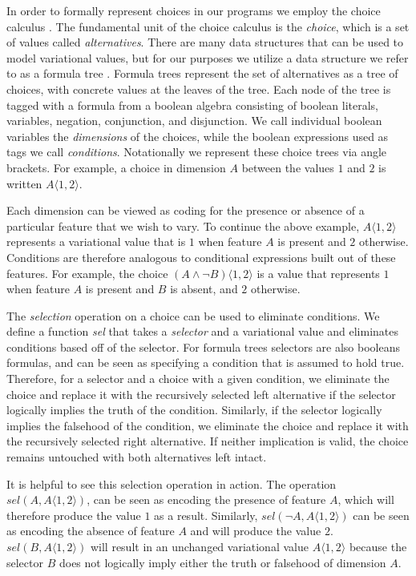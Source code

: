 \documentclass[12pt,oneside]{book}
\newcommand{\tagtree}[3]{#1 \langle #2, #3 \rangle}
\begin{document}
In order to formally represent choices in our programs we employ the choice
calculus \cite{Walk13thesis,EW11tosem}. The fundamental unit of the choice calculus is
the \emph{choice}, which is a set of values called \emph{alternatives}.
There are many data structures that can be used to model
variational values, but for our purposes we utilize a data structure we refer
to as a formula tree \cite{Walk14onward,WO14gpce}.
Formula trees represent the set of alternatives as a tree of choices, with concrete
values at the leaves of the tree. Each node of the tree is tagged with a formula from a boolean
algebra consisting of boolean literals, variables, negation, conjunction, and disjunction. We call individual
boolean variables the \emph{dimensions} of the choices, while the boolean expressions used as tags we call \emph{conditions}. Notationally we represent these choice trees
via angle brackets. For example, a choice in dimension $A$
between the values $1$ and $2$ is written $\tagtree{A}{1}{2}$.

Each dimension can be viewed as coding for the presence or absence of a
particular feature that we wish to vary. To continue the above example, $\tagtree{A}{1}{2}$
represents a variational value that is $1$ when feature $A$ is present and $2$ otherwise. Conditions
are therefore analogous to conditional expressions built out of these features. For example, the choice $\tagtree{(A \wedge \neg B)}{1}{2}$
is a value that represents $1$ when feature $A$ is present and $B$ is absent, and $2$ otherwise.

The \emph{selection} operation on a choice can be used to eliminate conditions. We define a function
\emph{sel} that takes a \emph{selector} and a variational value and eliminates conditions based off
of the selector. For formula trees selectors are also booleans formulas, and can be seen as specifying
a condition that is assumed to hold true. Therefore, for a
selector and a choice with a given condition, we eliminate the choice and replace it with the recursively selected left alternative if the selector logically implies
the truth of the condition. Similarly, if the selector logically implies the falsehood of the condition, we eliminate the choice
and replace it with the recursively selected right alternative. If neither implication is valid, the choice remains untouched with
both alternatives left intact.

It is helpful to see this selection operation in action. The operation
$\mathit{sel}(A,\tagtree{A}{1}{2})$, can be seen as encoding the presence of feature $A$, which
will therefore produce the value $1$ as a result. Similarly, $\mathit{sel}(\neg A,\tagtree{A}{1}{2})$ can be seen as encoding the absence of feature $A$ and will
produce the value $2$. $\mathit{sel}(B,\tagtree{A}{1}{2})$ will result in an unchanged variational
value $\tagtree{A}{1}{2}$ because the selector $B$ does not logically imply either the truth or falsehood
of dimension $A$.
\end{document}
